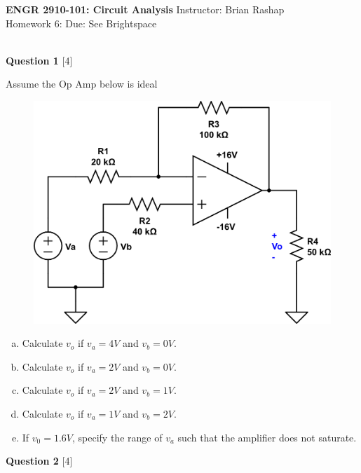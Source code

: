 \documentclass[12pt]{article}
\begin{document}
\begin{center}
\hfil
{\large\bf {ENGR 2910-101: Circuit Analysis}}
\hfill Instructor: Brian Rashap\\
Homework 6:  \hfill Due: See Brightspace\\
\hrulefill\\
\end{center}

{\bf Question 1} [4] %

Assume the Op Amp below is ideal

\begin{figure}[h!]
\begin{center}
 \includegraphics[scale=0.4]{p5_4.png}
\end{center}
\end{figure}

\begin{enumerate}[(a)]
\item Calculate $v_o$ if $v_a = 4V$ and $v_b = 0V$.
\item Calculate $v_o$ if $v_a = 2V$ and $v_b = 0V$.
\item Calculate $v_o$ if $v_a = 2V$ and $v_b = 1V$.
\item Calculate $v_o$ if $v_a = 1V$ and $v_b = 2V$.
\item If $v_0 = 1.6V$, specify the range of $v_a$ such that the amplifier does not saturate.
\end{enumerate}


\vspace{0.1in}

{\bf Question 2} [4] %
\end{document}
